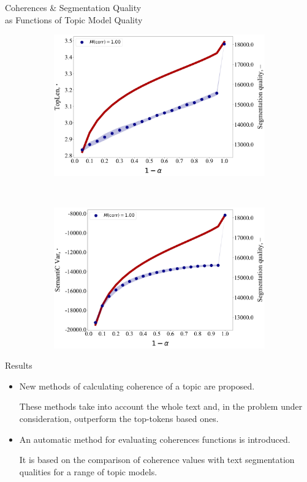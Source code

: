 \documentclass[russian]{beamer}
\begin{document}
\begin{frame}{Coherences \& Segmentation Quality\\as Functions of Topic Model Quality}
\begin{figure}[h]
\begin{subfigure}[t]{0.48\textwidth}
      \includegraphics[width=\linewidth]{toplen-iteration.jpg}
    \end{subfigure}
    ~
    \begin{subfigure}[t]{0.48\textwidth}
      \includegraphics[width=\linewidth]{semantic_var-iteration.jpg}
    \end{subfigure}
  \end{figure}
\end{frame}

\begin{frame}{Results}
  \begin{itemize}
  \setlength\itemsep{0.5cm}
  \item
    New methods of calculating coherence of a topic are proposed.
    
    \smallskip
    
    These methods take into account the whole text and, in the problem under consideration, outperform the top-tokens based ones.
  \item
    An automatic method for evaluating coherences functions is introduced.
    
    \smallskip
    
    It is based on the comparison of coherence values with text segmentation qualities for a range of topic models.
  \end{itemize}
\end{frame}
\end{document}

